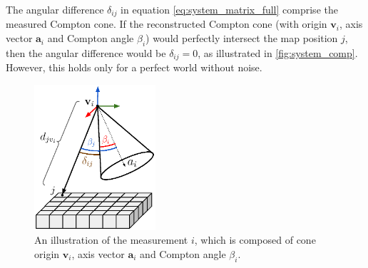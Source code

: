 The angular difference $\delta_{ij}$ in equation \ref{eq:system_matrix_full} comprise the measured Compton cone.
If the reconstructed Compton cone (with origin $\mathbf{v}_{i}$, axis vector $\mathbf{a}_{i}$ and Compton angle $\beta_{i}$) would perfectly intersect the map position $j$, then the angular difference would be $\delta_{ij} = 0$, as illustrated in  \autoref{fig:system_comp}.
However, this holds only for a perfect world without noise.

\begin{figure}[!h]
  \centering
    \includegraphics[width=0.4\textwidth]{./fig/photos/cone_error_ver2.eps}
    \caption{An illustration of the measurement $i$, which is composed of cone origin $\mathbf{v}_{i}$, axis vector $\mathbf{a}_{i}$ and Compton angle $\beta_{i}$.}
    \label{fig:system_comp}
\end{figure}
